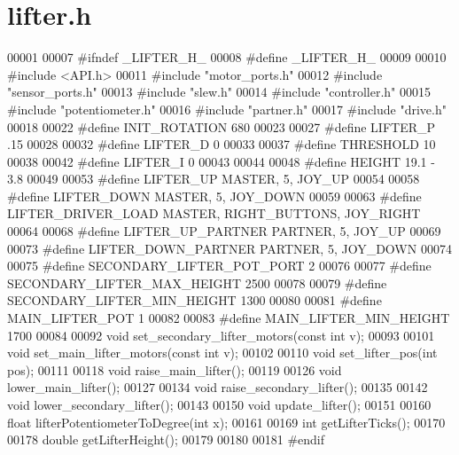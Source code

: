 \section{lifter.\+h}
\label{lifter_8h_source}

\begin{DoxyCode}
00001 
00007 \textcolor{preprocessor}{#ifndef \_LIFTER\_H\_}
00008 \textcolor{preprocessor}{#define \_LIFTER\_H\_}
00009 
00010 \textcolor{preprocessor}{#include <API.h>}
00011 \textcolor{preprocessor}{#include "motor_ports.h"}
00012 \textcolor{preprocessor}{#include "sensor_ports.h"}
00013 \textcolor{preprocessor}{#include "slew.h"}
00014 \textcolor{preprocessor}{#include "controller.h"}
00015 \textcolor{preprocessor}{#include "potentiometer.h"}
00016 \textcolor{preprocessor}{#include "partner.h"}
00017 \textcolor{preprocessor}{#include "drive.h"}
00018 
00022 \textcolor{preprocessor}{#define INIT\_ROTATION 680}
00023 
00027 \textcolor{preprocessor}{#define LIFTER\_P .15}
00028 
00032 \textcolor{preprocessor}{#define LIFTER\_D 0}
00033 
00037 \textcolor{preprocessor}{#define THRESHOLD 10}
00038 
00042 \textcolor{preprocessor}{#define LIFTER\_I 0}
00043 
00044 
00048 \textcolor{preprocessor}{#define HEIGHT 19.1 - 3.8}
00049 
00053 \textcolor{preprocessor}{#define LIFTER\_UP MASTER, 5, JOY\_UP}
00054 
00058 \textcolor{preprocessor}{#define LIFTER\_DOWN MASTER, 5, JOY\_DOWN}
00059 
00063 \textcolor{preprocessor}{#define LIFTER\_DRIVER\_LOAD MASTER, RIGHT\_BUTTONS, JOY\_RIGHT}
00064 
00068 \textcolor{preprocessor}{#define LIFTER\_UP\_PARTNER PARTNER, 5, JOY\_UP}
00069 
00073 \textcolor{preprocessor}{#define LIFTER\_DOWN\_PARTNER PARTNER, 5, JOY\_DOWN}
00074 
00075 \textcolor{preprocessor}{#define SECONDARY\_LIFTER\_POT\_PORT 2}
00076 
00077 \textcolor{preprocessor}{#define SECONDARY\_LIFTER\_MAX\_HEIGHT 2500}
00078 
00079 \textcolor{preprocessor}{#define SECONDARY\_LIFTER\_MIN\_HEIGHT 1300}
00080 
00081 \textcolor{preprocessor}{#define MAIN\_LIFTER\_POT 1}
00082 
00083 \textcolor{preprocessor}{#define MAIN\_LIFTER\_MIN\_HEIGHT 1700}
00084 
00092 \textcolor{keywordtype}{void} set_secondary_lifter_motors(\textcolor{keyword}{const} \textcolor{keywordtype}{int} v);
00093 
00101 \textcolor{keywordtype}{void} set_main_lifter_motors(\textcolor{keyword}{const} \textcolor{keywordtype}{int} v);
00102 
00110 \textcolor{keywordtype}{void} set_lifter_pos(\textcolor{keywordtype}{int} pos);
00111 
00118 \textcolor{keywordtype}{void} raise_main_lifter();
00119 
00126 \textcolor{keywordtype}{void} lower_main_lifter();
00127 
00134 \textcolor{keywordtype}{void} raise_secondary_lifter();
00135 
00142 \textcolor{keywordtype}{void} lower_secondary_lifter();
00143 
00150 \textcolor{keywordtype}{void} update_lifter();
00151 
00160 \textcolor{keywordtype}{float} lifterPotentiometerToDegree(\textcolor{keywordtype}{int} x);
00161 
00169 \textcolor{keywordtype}{int} getLifterTicks();
00170 
00178 \textcolor{keywordtype}{double} getLifterHeight();
00179 
00180 
00181 \textcolor{preprocessor}{#endif}
\end{DoxyCode}
